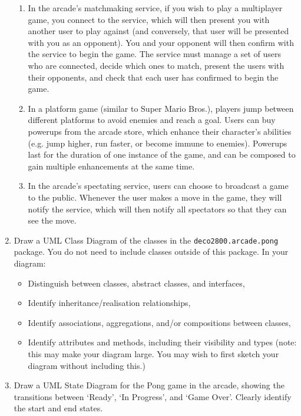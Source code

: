 \documentclass[a4paper,11pt]{article}
\begin{document}
\begin{enumerate}
\begin{enumerate}
\item
In the arcade's matchmaking service, if you wish to play a multiplayer game,
you connect to the service, which will then present you with another user to
play against (and conversely, that user will be presented with you as an
opponent). You and your opponent will then confirm with the service to begin
the game.
The service must manage a set of users who are connected, decide
which ones to match, present the users with their opponents, and check
that each user has confirmed to begin the game.

\item
In a platform game (similar to Super Mario Bros.), players jump between different
platforms to avoid enemies and reach a goal. Users can buy powerups from the
arcade store, which enhance their character's abilities
(e.g. jump higher, run faster, or become immune to enemies).
Powerups last for the duration of one instance of the game,
and can be composed to gain multiple enhancements at the same time.

\item
In the arcade's spectating service, users can choose to broadcast a game to
the public. Whenever the user makes a move in the game, they will notify the
service, which will then notify all spectators so that they can see the move.
\end{enumerate}

\item
Draw a UML Class Diagram of the classes in the {\tt deco2800.arcade.pong}
package. You do not need to include classes outside of this package.
In your diagram:
\begin{itemize}
\item
Distinguish between classes, abstract classes, and interfaces,
\item
Identify inheritance/realisation relationships,
\item
Identify associations, aggregations, and/or compositions between classes,
\item
Identify attributes and methods, including their visibility and types
(note: this may make your diagram large. You may wish to first sketch your
diagram without including this.)
\end{itemize}

\item
Draw a UML State Diagram for the Pong game in the arcade, showing the transitions
between `Ready', `In Progress', and `Game Over'. Clearly identify the start and
end states.


\end{enumerate}
\end{document}
